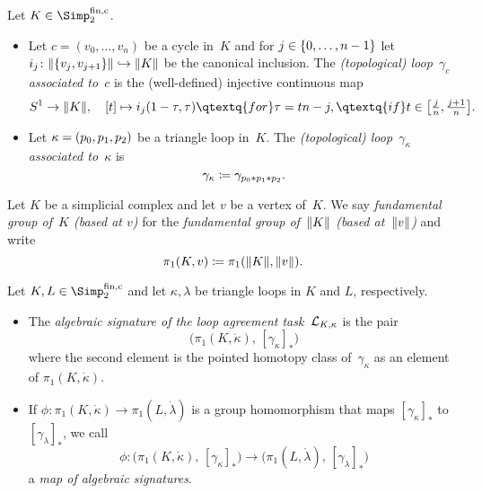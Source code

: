 \begin{thDef}
    \label{ch3:def:assoctopoloop}
    Let $K\in\finSimp$.
    \begin{itemize}
        \item
            Let $c=(v_0,\dots,v_n)$ be a cycle in~$K$ and for
            $j\in\{0,\ldots,n-1\}$ let $i_j\colon\lVert\{v_j,v_{j+1}\}\rVert 
            \hookrightarrow\lVert K\rVert$ be the canonical inclusion.
            The \emph{(topological) loop~$\gamma_c$ associated to~$c$} is the
            (well-defined) injective continuous map
            \[
                S^1\to\geom K, \quad
                [t]\mapsto i_j(1-\tau,\tau) \qtextq{for} \tau=tn-j,
                    \qtextq{if} t\in\bigl[\tfrac{j}{n}, \tfrac{j+1}{n}\bigr]
            . \]
            
        \item
            Let $\kappa=(p_0,p_1,p_2)$ be a triangle loop in~$K$. The \emph{(topological)
            loop~$\gamma_\kappa$ associated to~$\kappa$} is
            \[ \gamma_\kappa \coloneqq \gamma_{p_0\ast p_1\ast p_2}  . \]
    \end{itemize}
\end{thDef}

\begin{thConvention}
    Let $K$ be a simplicial complex and let $v$ be a vertex of~$K$. We say
    \emph{fundamental group of~$K$ (based at $v$)} for the \emph{fundamental
    group of~$\lVert K\rVert$ (based at~$\lVert v\rVert$)} and write
    \[ \pi_1(K,v) \coloneqq \pi_1(\lVert K\rVert, \lVert v\rVert) . \]
\end{thConvention}

\begin{thDef}
    Let $K,L\in\finSimp$ and let $\kappa,\lambda$ be triangle loops in
    $K$ and $L$, respectively.
    \begin{itemize}
        \item
            The \emph{algebraic signature %
                      of the loop agreement task~$\mathcal{L}_{K,\kappa}$}
            is the pair
            \[ \bigl( \pi_1(K,\dot\kappa), \, [\gamma_\kappa]_\ast \bigr) \]
            where the second element is the pointed homotopy class
            of~$\gamma_\kappa$ as an element of $\pi_1(K,\dot\kappa)$.
            
        \item
            If $\phi\colon\pi_1(K,\dot\kappa)\to\pi_1(L,\dot\lambda)$ is a
            group homomorphism that maps $[\gamma_\kappa]_\ast$ to
            $[\gamma_\lambda]_\ast$, we call
            \[ \phi\colon \bigl( \pi_1(K,\dot\kappa), \, [\gamma_\kappa]_\ast \bigr)
                \to \bigl( \pi_1(L,\dot\lambda), \, [\gamma_\lambda]_\ast \bigr)
            \]
            a \emph{map of algebraic signatures}.
    \end{itemize}
\end{thDef}

